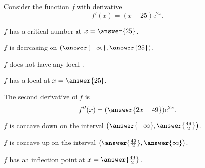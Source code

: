 \documentclass{ximera}
\author{Nela Lakos \and Kyle Parsons}
\begin{document}
\begin{exercise}

Consider the function $f$ with derivative
\[
f'(x) = (x-25)e^{2x}.
\]

$f$ has a critical number at $x=\answer{25}$.

$f$ is decreasing on $\left(\answer{-\infty},\answer{25}\right)$.

$f$ does not have any local .

$f$ has a local  at $x=\answer{25}$.

The second derivative of $f$ is
\[
f''(x) =( \answer{2x-49})e^{2x}.
\]

$f$ is concave down on the interval $\left(\answer{-\infty},\answer{\frac{49}{2}}\right)$.

$f$ is concave up on the interval $\left(\answer{\frac{49}{2}},\answer{\infty}\right)$.

$f$ has an inflection point at $x=\answer{\frac{49}{2}}$.



\end{exercise}
\end{document}
